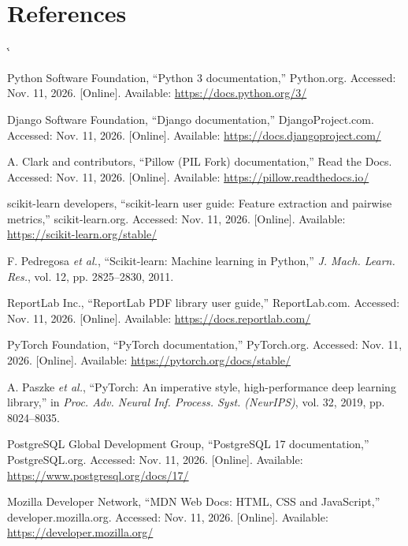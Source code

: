 \documentclass[12pt,a4paper,oneside]{report}
\makeatletter
\renewenvironment{thebibliography}[1]
  {\list{\@biblabel{\@arabic\c@enumiv}}%
    {\settowidth\labelwidth{\@biblabel{#1}}%
     \leftmargin\labelwidth
     \advance\leftmargin\labelsep
     \usecounter{enumiv}%
     \let\p@enumiv\@empty
     \renewcommand\theenumiv{\@arabic\c@enumiv}}%
   \sloppy\clubpenalty4000\widowpenalty4000\sfcode`\.\@m}
  {\def\@noitemerr{\@latex@warning{Empty `thebibliography' environment}}\endlist}
\makeatother
\begin{document}
\chapter{References}
\begingroup
\fontsize{9.5}{11.4}\selectfont
\begin{thebibliography}{99}
\setlength{\itemsep}{0.5pt}
\setlength{\parskip}{0pt}

Python Software Foundation, ``Python 3 documentation,'' Python.org. Accessed: Nov. 11, 2026. [Online]. Available: \url{https://docs.python.org/3/}

Django Software Foundation, ``Django documentation,'' DjangoProject.com. Accessed: Nov. 11, 2026. [Online]. Available: \url{https://docs.djangoproject.com/}

A. Clark and contributors, ``Pillow (PIL Fork) documentation,'' Read the Docs. Accessed: Nov. 11, 2026. [Online]. Available: \url{https://pillow.readthedocs.io/}

scikit-learn developers, ``scikit-learn user guide: Feature extraction and pairwise metrics,'' scikit-learn.org. Accessed: Nov. 11, 2026. [Online]. Available: \url{https://scikit-learn.org/stable/}

F. Pedregosa \emph{et al.}, ``Scikit-learn: Machine learning in Python,'' \emph{J. Mach. Learn. Res.}, vol. 12, pp. 2825--2830, 2011.

ReportLab Inc., ``ReportLab PDF library user guide,'' ReportLab.com. Accessed: Nov. 11, 2026. [Online]. Available: \url{https://docs.reportlab.com/}

PyTorch Foundation, ``PyTorch documentation,'' PyTorch.org. Accessed: Nov. 11, 2026. [Online]. Available: \url{https://pytorch.org/docs/stable/}

A. Paszke \emph{et al.}, ``PyTorch: An imperative style, high-performance deep learning library,'' in \emph{Proc. Adv. Neural Inf. Process. Syst. (NeurIPS)}, vol. 32, 2019, pp. 8024--8035.

PostgreSQL Global Development Group, ``PostgreSQL 17 documentation,'' PostgreSQL.org. Accessed: Nov. 11, 2026. [Online]. Available: \url{https://www.postgresql.org/docs/17/}

Mozilla Developer Network, ``MDN Web Docs: HTML, CSS and JavaScript,'' developer.mozilla.org. Accessed: Nov. 11, 2026. [Online]. Available: \url{https://developer.mozilla.org/}


\end{thebibliography}
\end{document}
